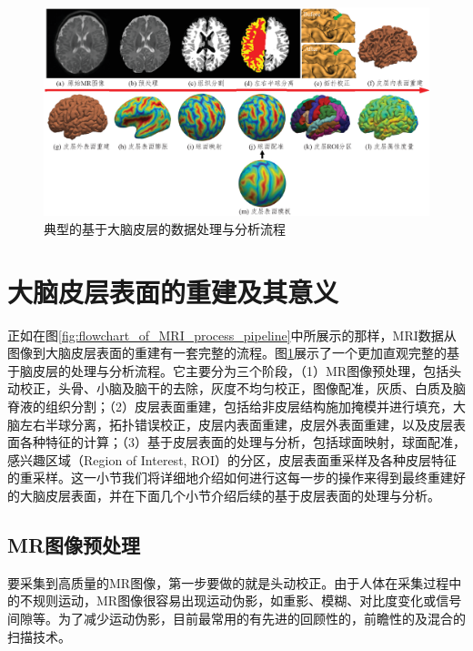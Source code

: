 \begin{figure}[h]
    \centering
    \includegraphics[width=\linewidth]{figure/flowchart_of_surface_based_analysis.eps}
    \caption{\label{fig:flowchart_of_surface_based_analysis}典型的基于大脑皮层的数据处理与分析流程}
\end{figure}

\section{大脑皮层表面的重建及其意义}
正如在图\ref{fig:flowchart_of_MRI_process_pipeline}中所展示的那样，MRI数据从图像到大脑皮层表面的重建有一套完整的流程。图\ref{fig:flowchart_of_surface_based_analysis}展示了一个更加直观完整的基于脑皮层的处理与分析流程。它主要分为三个阶段，（1）MR图像预处理，包括头动校正，头骨、小脑及脑干的去除，灰度不均匀校正，图像配准，灰质、白质及脑脊液的组织分割；（2）皮层表面重建，包括给非皮层结构施加掩模并进行填充，大脑左右半球分离，拓扑错误校正，皮层内表面重建，皮层外表面重建，以及皮层表面各种特征的计算；（3）基于皮层表面的处理与分析，包括球面映射，球面配准，感兴趣区域（Region of Interest, ROI）的分区，皮层表面重采样及各种皮层特征的重采样。这一小节我们将详细地介绍如何进行这每一步的操作来得到最终重建好的大脑皮层表面，并在下面几个小节介绍后续的基于皮层表面的处理与分析。

\subsection{MR图像预处理}\label{sec:MR图像预处理}
要采集到高质量的MR图像，第一步要做的就是头动校正\cite{zaitsev2015motion}。由于人体在采集过程中的不规则运动，MR图像很容易出现运动伪影，如重影、模糊、对比度变化或信号间隙等。为了减少运动伪影，目前最常用的有先进的回顾性的\cite{atkinson1999automatic}，前瞻性的\cite{zaitsev2006magnetic}及混合的\cite{aksoy2012hybrid}扫描技术。

